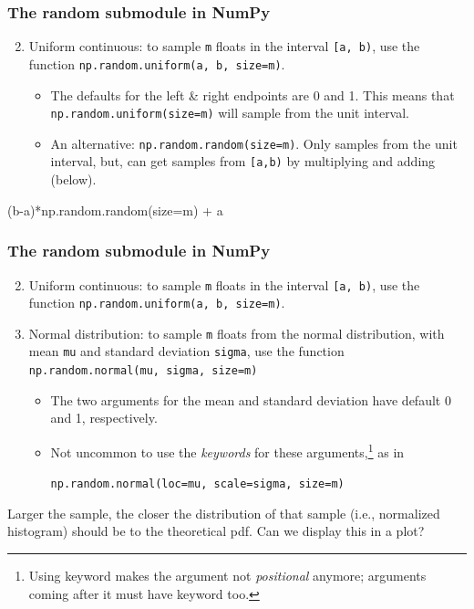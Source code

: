 \documentclass{beamer}
\newenvironment{codeblock}
    {\hfill\begin{beamerboxesrounded}[lower=codecol, width=0.8\textwidth]
    \medskip

    }
    { 
    \end{beamerboxesrounded}\hfill
    }
\theoremstyle{example}
\newcommand{\ttt}[1]{{\small\texttt{#1}}}
\begin{document}
\begin{frame}[fragile]
\frametitle{The {\ttm random} submodule in NumPy}

\begin{enumerate}
    \setcounter{enumi}{1}
    \item Uniform continuous: to sample \ttt{m} floats in the interval \ttt{[a, b)}, use the function \ttt{np.random.uniform(a, b, size=m)}.
    \begin{itemize}
        \item The defaults for the left \& right endpoints are 0 and 1. This means that \ttt{np.random.uniform(size=m)} will sample from the unit interval.
        \item An alternative: \ttt{np.random.random(size=m)}. Only samples from the unit interval, but, can get samples from \ttt{[a,b)} by multiplying and adding (below).
    \end{itemize}
\end{enumerate}

\vspace*{12pt}
\begin{codeblock}

\begin{python}[numbers=none]
(b-a)*np.random.random(size=m) + a
\end{python}

\end{codeblock}

\end{frame}

\begin{frame}[fragile]
    \frametitle{The {\ttm random} submodule in NumPy}
    
    \begin{enumerate}
        \setcounter{enumi}{1}
        \item Uniform continuous: to sample \ttt{m} floats in the interval \ttt{[a, b)}, use the function \ttt{np.random.uniform(a, b, size=m)}.
        \item Normal distribution: to sample \ttt{m} floats from the normal distribution, with mean \ttt{mu} and standard deviation \ttt{sigma}, use the function \ttt{np.random.normal(mu, sigma, size=m)}
        \begin{itemize}
            \item The two arguments for the mean and standard deviation have default 0 and 1, respectively.
            \item Not uncommon to use the \emph{keywords} for these arguments,\footnote{Using keyword makes the argument not \emph{positional} anymore; arguments coming after it must have keyword too.} as in 
            \begin{center}\ttt{np.random.normal(loc=mu, scale=sigma, size=m)}\end{center}
        \end{itemize}
    \end{enumerate}

    Larger the sample, the closer the distribution of that sample (i.e., normalized histogram) should be to the theoretical pdf. Can we display this in a plot?
\end{frame}
    
\end{document}
